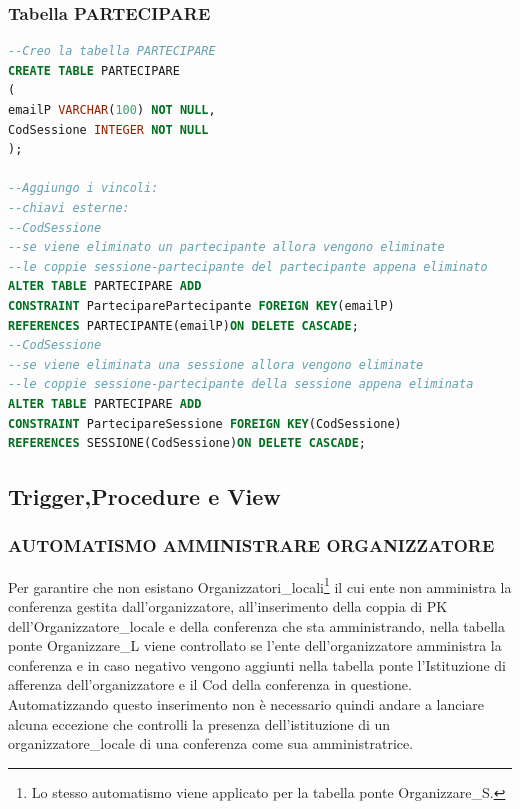 \documentclass[a4page]{article}
\begin{document}
\subsubsection{Tabella PARTECIPARE}
\begin{lstlisting}[language=SQL,
        deletekeywords={IDENTITY,INT},
        morekeywords={clustered},    
        framesep=10pt,
        framextopmargin=10pt]
--Creo la tabella PARTECIPARE
CREATE TABLE PARTECIPARE
(
emailP VARCHAR(100) NOT NULL,
CodSessione INTEGER NOT NULL
);

--Aggiungo i vincoli:
--chiavi esterne:
--CodSessione
--se viene eliminato un partecipante allora vengono eliminate
--le coppie sessione-partecipante del partecipante appena eliminato
ALTER TABLE PARTECIPARE ADD
CONSTRAINT ParteciparePartecipante FOREIGN KEY(emailP)
REFERENCES PARTECIPANTE(emailP)ON DELETE CASCADE;
--CodSessione
--se viene eliminata una sessione allora vengono eliminate
--le coppie sessione-partecipante della sessione appena eliminata
ALTER TABLE PARTECIPARE ADD
CONSTRAINT PartecipareSessione FOREIGN KEY(CodSessione)
REFERENCES SESSIONE(CodSessione)ON DELETE CASCADE;        

\end{lstlisting}
\newpage
\subsection{Trigger,Procedure e View}
\subsubsection{AUTOMATISMO AMMINISTRARE ORGANIZZATORE}
Per garantire che non esistano Organizzatori\_locali\footnote{Lo stesso automatismo viene applicato per la tabella ponte Organizzare\_S.} il cui ente non amministra la conferenza gestita dall'organizzatore, all'inserimento della coppia di PK dell'Organizzatore\_locale e della conferenza che sta amministrando, nella tabella ponte Organizzare\_L viene controllato se l'ente dell'organizzatore amministra la conferenza e in caso negativo vengono aggiunti nella tabella ponte l'Istituzione di afferenza dell'organizzatore e il Cod della conferenza in questione.
Automatizzando questo inserimento non è necessario quindi andare a lanciare alcuna eccezione che controlli la presenza dell'istituzione di un organizzatore\_locale di una conferenza come  sua amministratrice.
\vspace{1cm}
\end{document}
